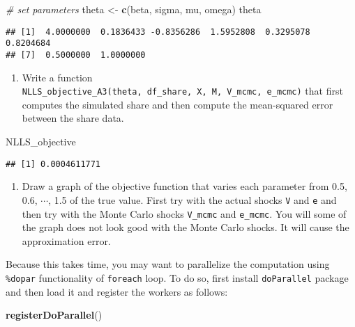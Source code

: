 \documentclass[
]{book}
\newenvironment{Shaded}{\begin{snugshade}}{\end{snugshade}}
\newcommand{\CommentTok}[1]{\textcolor[rgb]{0.56,0.35,0.01}{\textit{#1}}}
\newcommand{\KeywordTok}[1]{\textcolor[rgb]{0.13,0.29,0.53}{\textbf{#1}}}
\newcommand{\NormalTok}[1]{#1}
\newcommand{\StringTok}[1]{\textcolor[rgb]{0.31,0.60,0.02}{#1}}
\providecommand{\tightlist}{%
  \setlength{\itemsep}{0pt}\setlength{\parskip}{0pt}}
\begin{document}
\begin{Shaded}
\begin{Highlighting}[]
\CommentTok{# set parameters}
\NormalTok{theta <-}\StringTok{ }\KeywordTok{c}\NormalTok{(beta, sigma, mu, omega)}
\NormalTok{theta}
\end{Highlighting}
\end{Shaded}

\begin{verbatim}
## [1]  4.0000000  0.1836433 -0.8356286  1.5952808  0.3295078  0.8204684
## [7]  0.5000000  1.0000000
\end{verbatim}

\begin{enumerate}
\def\labelenumi{\arabic{enumi}.}
\setcounter{enumi}{5}
\tightlist
\item
  Write a function \texttt{NLLS\_objective\_A3(theta,\ df\_share,\ X,\ M,\ V\_mcmc,\ e\_mcmc)} that first computes the simulated share and then compute the mean-squared error between the share data.
\end{enumerate}

\begin{Shaded}
\begin{Highlighting}[]
\NormalTok{NLLS_objective}
\end{Highlighting}
\end{Shaded}

\begin{verbatim}
## [1] 0.0004611771
\end{verbatim}

\begin{enumerate}
\def\labelenumi{\arabic{enumi}.}
\setcounter{enumi}{6}
\tightlist
\item
  Draw a graph of the objective function that varies each parameter from 0.5, 0.6, \(\cdots\), 1.5 of the true value. First try with the actual shocks \texttt{V} and \texttt{e} and then try with the Monte Carlo shocks \texttt{V\_mcmc} and \texttt{e\_mcmc}. You will some of the graph does not look good with the Monte Carlo shocks. It will cause the approximation error.
\end{enumerate}

Because this takes time, you may want to parallelize the computation using \texttt{\%dopar} functionality of \texttt{foreach} loop. To do so, first install \texttt{doParallel} package and then load it and register the workers as follows:

\begin{Shaded}
\begin{Highlighting}[]
\KeywordTok{registerDoParallel}\NormalTok{()}
\end{Highlighting}
\end{Shaded}
\end{document}
